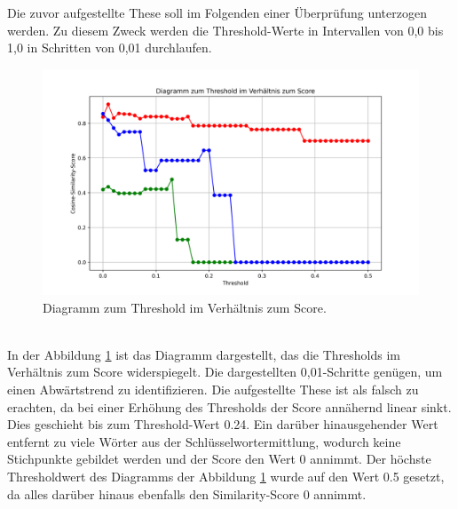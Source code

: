 Die zuvor aufgestellte These soll im Folgenden einer Überprüfung unterzogen werden. Zu diesem Zweck werden die Threshold-Werte in Intervallen von 0,0 bis 1,0 in Schritten von 0,01 durchlaufen.
\begin{figure}[H]
	\centering  
	\includegraphics[width=\linewidth]{plot/e2-threshold-score.png}
	\caption{Diagramm zum Threshold im Verhältnis zum Score.}
	\label{fig:thresholdvsscore}
\end{figure}\mbox{} \\
In der Abbildung \ref{fig:thresholdvsscore} ist das Diagramm dargestellt, das die Thresholds im Verhältnis zum Score widerspiegelt. Die dargestellten 0,01-Schritte genügen, um einen Abwärtstrend zu identifizieren. Die aufgestellte These ist als falsch zu erachten, da bei einer Erhöhung des Thresholds der Score annähernd linear sinkt. Dies geschieht bis zum Threshold-Wert 0.24. Ein darüber hinausgehender Wert entfernt zu viele Wörter aus der Schlüsselwortermittlung, wodurch keine Stichpunkte gebildet werden und der Score den Wert 0 annimmt. Der höchste Thresholdwert des Diagramms der Abbildung \ref{fig:thresholdvsscore} wurde auf den Wert 0.5 gesetzt, da alles darüber hinaus ebenfalls den Similarity-Score 0 annimmt.
